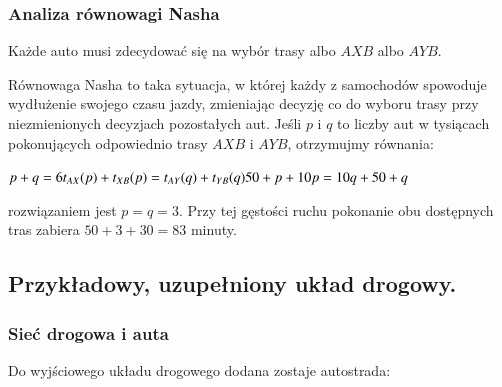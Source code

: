 \documentclass[twoside,12pt]{report}
\begin{document}
\subsubsection{Analiza równowagi Nasha}

Każde auto musi zdecydować się na wybór trasy albo $AXB$ albo $AYB$.

Równowaga Nasha to taka sytuacja, w której każdy z samochodów spowoduje wydłużenie swojego czasu jazdy, zmieniając decyzję co do wyboru trasy przy niezmienionych decyzjach pozostałych aut.
\newline\newline
Jeśli $p$ i $q$ to liczby aut w tysiącach pokonujących odpowiednio trasy $AXB$ i $AYB$, otrzymujmy równania:

\begin{center}
\begin{math}
p+q = 6 \newline
t_{AX}(p)+t_{XB}(p) = t_{AY}(q) + t_{YB}(q) \newline
50+p+10p = 10q+50+q \newline
\end{math}
\end{center}
rozwiązaniem jest $p=q=3$.
Przy tej gęstości ruchu pokonanie obu dostępnych tras zabiera $50+3+30=83$ minuty.

\subsection{Przykładowy, uzupełniony układ drogowy.}
\subsubsection{Sieć drogowa i auta}
Do wyjściowego układu drogowego dodana zostaje autostrada:
\end{document}
